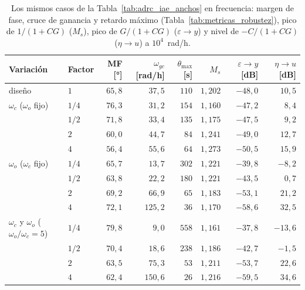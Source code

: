 \begin{table}[H]
\centering
\caption[Indicadores en frecuencia al variar los anchos de banda]{Los mismos
  casos de la Tabla~\ref{tab:adrc_iae_anchos} en frecuencia: margen de fase,
  cruce de ganancia y retardo máximo (Tabla~\ref{tab:metricas_robustez}), pico de
  $1/(1 + CG)$ ($M_s$), pico de $G/(1 + CG)$ ($\varepsilon \to y$) y nivel de
  $-C/(1 + CG)$ ($\eta \to u$) a $10^4$~rad/h.}
\label{tab:adrc_frecuencia_kESO}
\small
\begin{tabular}{llrrrrrr}
\toprule
\textbf{Variación} & \textbf{Factor} & MF [°] & $\omega_{gc}$ [rad/h] & $\theta_{\max}$ [s] & $M_s$ &
$\varepsilon \to y$ [dB] & $\eta \to u$ [dB] \\
\midrule
diseño & $1$ & $65{,}8$ & $37{,}5$ & $110$ & $1{,}202$ & $-48{,}0$ & $10{,}5$ \\
\midrule
$\omega_c$ ($\omega_o$ fijo) & $1/4$ & $76{,}3$ & $31{,}2$ & $154$ & $1{,}160$ & $-47{,}2$ & $8{,}4$ \\
 & $1/2$ & $71{,}8$ & $33{,}4$ & $135$ & $1{,}175$ & $-47{,}5$ & $9{,}2$ \\
 & $2$ & $60{,}0$ & $44{,}7$ & $84$ & $1{,}241$ & $-49{,}0$ & $12{,}7$ \\
 & $4$ & $56{,}4$ & $55{,}6$ & $64$ & $1{,}273$ & $-50{,}5$ & $15{,}9$ \\
\midrule
$\omega_o$ ($\omega_c$ fijo) & $1/4$ & $65{,}7$ & $13{,}7$ & $302$ & $1{,}221$ & $-39{,}8$ & $-8{,}2$ \\
 & $1/2$ & $63{,}8$ & $22{,}2$ & $180$ & $1{,}221$ & $-43{,}5$ & $0{,}7$ \\
 & $2$ & $69{,}2$ & $66{,}9$ & $65$ & $1{,}183$ & $-53{,}1$ & $21{,}2$ \\
 & $4$ & $72{,}1$ & $125{,}2$ & $36$ & $1{,}170$ & $-58{,}6$ & $32{,}5$ \\
\midrule
$\omega_c$ y $\omega_o$ ($\omega_o/\omega_c = 5$) & $1/4$ & $79{,}8$ & $9{,}0$ & $558$ & $1{,}161$ & $-37{,}8$ & $-13{,}6$ \\
 & $1/2$ & $70{,}4$ & $18{,}6$ & $238$ & $1{,}186$ & $-42{,}7$ & $-1{,}5$ \\
 & $2$ & $63{,}5$ & $75{,}3$ & $53$ & $1{,}211$ & $-53{,}7$ & $22{,}6$ \\
 & $4$ & $62{,}4$ & $150{,}6$ & $26$ & $1{,}216$ & $-59{,}5$ & $34{,}6$ \\
\bottomrule
\end{tabular}
\end{table}


